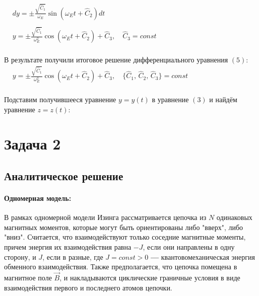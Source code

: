 \documentclass[oneside,final,14pt]{extarticle}
\begin{document}
		\begin{math}
			\begin{aligned}
				& dy = \pm \frac{\sqrt{\widehat{C}_1}}{\omega_{E}} \sin{(\omega_{E}t + \widehat{C}_{2})} dt \\\\
				& y = \pm \frac{\sqrt{\widehat{C}_1}}{\omega_{E}^{2}} \cos{(\omega_{E}t + \widehat{C}_{2})} + \widehat{C}_{3}, \quad \widehat{C}_{3} = const
			\end{aligned}
		\end{math} \\\\
		
		\noindent В результате получили итоговое решение дифференциального уравнения $(5)$: \\
		
		\begin{math}
			\begin{aligned}
				& y = \pm \frac{\sqrt{\widehat{C}_1}}{\omega_{E}^{2}} \cos{(\omega_{E}t + \widehat{C}_{2})} + \widehat{C}_{3}, \quad \{\widehat{C}_{1},\, \widehat{C}_{2},\, \widehat{C}_{3}\} = const
			\end{aligned}
		\end{math} \\\\
		
		\noindent Подставим получившееся уравнение $y = y(t)$ в уравнение $(3)$ и найдём уравнение $z = z(t)$:
		
	\newpage
	\section{Задача 2}
	\subsection{Аналитическое решение}
	\paragraph{Одномерная модель:}
	В рамках одномерной модели Изинга рассматривается цепочка из $N$ одинаковых магнитных моментов, которые могут быть ориентированы либо "вверх", либо "вниз". Считается, что взаимодействуют только соседние магнитные моменты, причем энергия их взаимодействия равна $-J$, если они направлены в одну сторону, и $J$, если в разные, где $J=const>0$ \textbf{---} квантовомеханическая энергия обменного взаимодействия. Также предполагается, что цепочка помещена в магнитное поле $\vec B$, и накладываются циклические граничные условия в виде взаимодействия первого и последнего атомов цепочки. 
\end{document}
